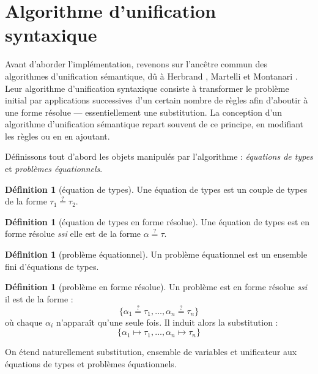 \documentclass[a4paper]{report}
\theoremstyle{definition}
\newtheorem{definition}[theoreme]{Définition}
\newcommand{\ssi}{\textit{ssi}\xspace}
\newcommand{\qeq}{\stackrel {\scriptscriptstyle ?} =}
\begin{document}

\section{Algorithme d'unification syntaxique}

Avant d'aborder l'implémentation, revenons sur l'ancêtre commun des algorithmes d'unification sémantique, dû à Herbrand \cite{Herbrand}, Martelli et Montanari \cite{Martelli_Montanari}. Leur algorithme d'unification syntaxique consiste à transformer le problème initial par applications successives d'un certain nombre de règles afin d'aboutir à une forme résolue — essentiellement une substitution. La conception d'un algorithme d'unification sémantique repart souvent de ce principe, en modifiant les règles ou en en ajoutant.

Définissons tout d'abord les objets manipulés par l'algorithme : \emph{équations de types} et \emph{problèmes équationnels}.

\begin{definition}[équation de types]
	Une équation de types est un couple de types de la forme $\tau_1 \qeq \tau_2$.
\end{definition}

\begin{definition}[équation de types en forme résolue]
	Une équation de types est en forme résolue \ssi elle est de la forme $\alpha \qeq \tau$.
\end{definition}

\begin{definition}[problème équationnel]
	Un problème équationnel est un ensemble fini d'équations de types.
\end{definition}

\begin{definition}[problème en forme résolue]
	Un problème est en forme résolue \ssi il est de la forme :
	\[ \{ \alpha_1 \qeq \tau_1, \dots, \alpha_n \qeq \tau_n \} \]
	où chaque $\alpha_i$ n'apparaît qu'une seule fois. Il induit alors la substitution :
	\[ \{ \alpha_1 \mapsto \tau_1, \dots, \alpha_n \mapsto \tau_n \} \]
\end{definition}

On étend naturellement substitution, ensemble de variables et unificateur aux équations de types et problèmes équationnels.
\end{document}

